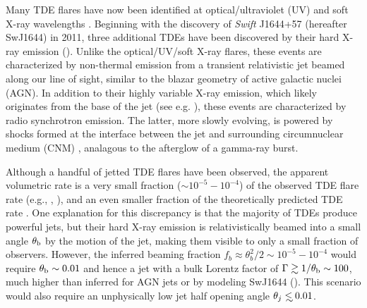 \documentclass[usenatbib,fleqn]{mnras}
\newcommand\lsim{\mathrel{\rlap{\lower4pt\hbox{\hskip1pt$\sim$}}
    \raise1pt\hbox{$<$}}}
\begin{document}
Many TDE flares have now been identified at optical/ultraviolet (UV)
\citep{Gezari+2008, Gezari+2009, van-Velzen+2011, Gezari+2012,
  Arcavi+2014, Chornock+2014, Holoien+2014, Vinko+2015, Holoien+2016}
and soft X-ray wavelengths \citep{Bade+1996, Grupe+1999,
  Komossa&Greiner1999, Greiner+2000, Esquej+2007, Maksym+2010,
  Saxton+2012}. Beginning with the discovery of {\it Swift} J1644+57
(hereafter SwJ1644) in 2011, three additional TDEs have been
discovered by their hard X-ray emission (\citealt{Bloom+2011,
  Levan+2011, Burrows+2011, Zauderer+2011, Cenko+2012, Pasham+2015,
  Brown+2015}).  Unlike the optical/UV/soft X-ray flares, these events
are characterized by non-thermal emission from a transient
relativistic jet beamed along our line of sight, similar to the blazar
geometry of active galactic nuclei (AGN).  In addition to their highly
variable X-ray emission, which likely originates from the base of the
jet (see e.g. \citealt{Bloom+2011, Crumley+2016}), these events are
characterized by radio synchrotron emission.  The latter, more slowly
evolving, is powered by shocks formed at the interface between the jet
and surrounding circumnuclear medium (CNM)
\citep{Bloom+2011,Giannios&Metzger2011,Metzger+2012,De-Colle+2012,Kumar+13,Mimica+2015},
analagous to the afterglow of a gamma-ray burst.

Although a handful of jetted TDE flares have been observed, the
apparent volumetric rate is a very small fraction ($\sim
10^{-5}-10^{-4}$) of the observed TDE flare rate (e.g.,
\citealt{Burrows+2011}, \citealt{Brown+2015}), and an even smaller
fraction of the theoretically predicted TDE rate
\citep{Wang&Merritt2004,Stone&Metzger2016}.  One explanation for this
discrepancy is that the majority of TDEs produce powerful jets, but
their hard X-ray emission is relativistically beamed into a small
angle $\theta_{\rm b}$ by the motion of the jet, making them visible
to only a small fraction of observers.  However, the inferred beaming
fraction $f_b \approx \theta_{b}^{2}/2 \sim 10^{-5}-10^{-4}$ would
require $\theta_{\rm b} \sim 0.01$ and hence a jet with a bulk Lorentz
factor of $\Gamma \gtrsim 1/\theta_{\rm b} \sim 100$, much higher than
inferred for AGN jets or by modeling SwJ1644
(\citealt{Metzger+2012}). This scenario 
would also require an unphysically low jet half opening angle
$\theta_j\lsim 0.01$.
\end{document}
